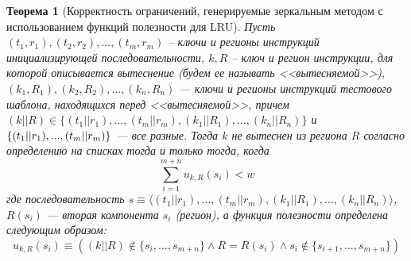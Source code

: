 \documentclass[14pt]{extreport}
\newtheorem{theorem}{Теорема}
\newcommand{\LRU}{\textsf{LRU}\xspace}
\begin{document}
\begin{theorem}[Корректность ограничений, генерируемые зеркальным методом с
использованием функций полезности для
\LRU]\label{correct_mirror_LRU} Пусть $(t_1, r_1), (t_2,r_2), ..., (t_m,r_m)$ --
ключи и регионы инструкций инициализирующей последовательности, $k, R$ -- ключ и
регион инструкции, для которой описывается вытеснение (будем ее называть
<<вытесняемой>>), $(k_1,R_1), (k_2,R_2), ..., (k_n,R_n)$ --- ключи и регионы
инструкций тестового шаблона, находящихся перед <<вытесняемой>>, причем $(k||R)
\in \{(t_1||r_1), ..., (t_m||r_m), (k_1||R_1), ..., (k_n||R_n)\}$ и
$\{(t_1||r_1), ...,\\(t_m||r_m)\}$ --- все разные. Тогда $k$ не вытеснен из
региона $R$ согласно определению на списках тогда и только тогда, когда
$$\sum\limits_{i=1}^{m+n} u_{k,R}(s_i) < w$$
где последовательность $s \equiv \langle (t_1||r_1), ..., (t_m||r_m),
(k_1||R_1), ...,
(k_n||R_n)\rangle$, $R(s_i)$ --- вторая компонента $s_i$ (регион), а функция
полезности определена следующим образом:
$$u_{k,R}(s_i) \equiv ((k||R) \notin \{s_i, ..., s_{m+n}\} \wedge
R = R(s_i) \wedge s_i \notin\{s_{i+1},..., s_{m+n}\})$$


\end{theorem}
\end{document}
